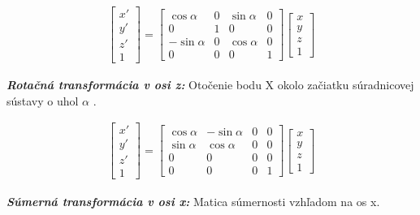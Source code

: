 \begin{equation}
\label{eq_kalib_rotat_y}
\begin{aligned}
\begin{bmatrix}
x' \\ y' \\ z' \\ 1 
\end{bmatrix}
=
\begin{bmatrix}
\cos\alpha & 0 & \sin\alpha & 0 \\
0 & 1 & 0 & 0 \\
-\sin\alpha & 0 & \cos\alpha & 0 \\
0 & 0 & 0 & 1 
\end{bmatrix}
\begin{bmatrix}
x \\ y \\ z \\ 1 
\end{bmatrix}
\end{aligned}
\end{equation}


\textbf{\textit{Rotačná transformácia v osi z:}} Otočenie bodu X okolo začiatku súradnicovej sústavy o uhol $\alpha$ .

\begin{equation}
\label{eq_kalib_rotat_z}
\begin{aligned}
\begin{bmatrix}
x' \\ y' \\ z' \\ 1 
\end{bmatrix}
=
\begin{bmatrix}
\cos\alpha & -\sin\alpha & 0 & 0  \\
\sin\alpha & \cos\alpha & 0 & 0 \\
0 & 0 & 0 & 0 \\
0 & 0 & 0 & 1 
\end{bmatrix}
\begin{bmatrix}
x \\ y \\ z \\ 1 
\end{bmatrix}
\end{aligned}
\end{equation}

\textbf{\textit{Súmerná transformácia v osi x:}} Matica súmernosti vzhľadom na os x.


